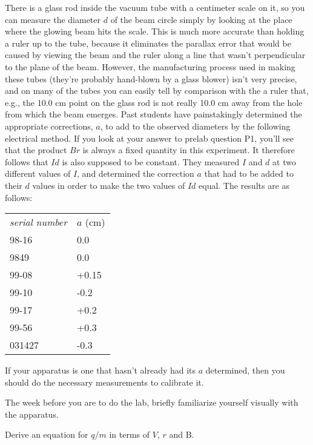 There is a glass rod inside the vacuum tube
with a centimeter scale
on it, so you can measure the diameter $d$ of the beam circle
simply by looking at the place where the glowing beam hits
the scale. This is much more accurate than holding a ruler
up to the tube, because it eliminates the parallax error
that would be caused by viewing the beam and the ruler along
a line that wasn't perpendicular to the plane of the beam.
However, the manufacturing process used in making these tubes
(they're probably hand-blown by a glass blower) isn't very
precise, and on many of the tubes you can easily tell by comparison
with the a ruler that, e.g., the 10.0 cm point on the glass rod is
not really 10.0 cm away from the hole from which the beam emerges.
Past students have painstakingly determined the appropriate corrections, $a$,
to add to the observed diameters by the following electrical method.
If you look at your answer to prelab question P1, you'll see that the
product $Br$ is always a fixed quantity in this experiment. It therefore
follows that $Id$ is also supposed to be constant. They measured $I$ and $d$
at two different values of $I$, and determined the correction $a$ that had
to be added to their $d$ values in order to make the two values of $Id$
equal. The results are as follows:

\begin{tabular}{ll}
  \emph{serial number} & $a$ (cm) \\
  98-16 & 0.0 \\
  9849  & 0.0 \\
  99-08 & +0.15 \\
  99-10 & -0.2 \\
  99-17 & +0.2 \\
  99-56 & +0.3 \\
  031427 & -0.3
\end{tabular}

If your apparatus is one that hasn't already had its $a$ determined, then
you should do the necessary measurements to calibrate it.

\prelab

The week before you are to do the lab, briefly familiarize
yourself visually with the apparatus.

\hvsafety


\prelabquestion  Derive an equation for $q/m$ in terms of $V$, $r$ and B.

